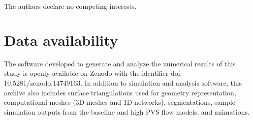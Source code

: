 \documentclass[fleqn,10pt]{wlscirep}
\begin{document}
The authors declare no competing interests.

\section*{Data availability}

The software developed to generate and analyze the numerical results
of this study is openly available on Zenodo with the identifier doi:
10.5281/zenodo.14749163. In addition to simulation and analysis
software, this archive also includes surface triangulations used for
geometry representation, computational meshes (3D meshes and 1D
networks), segmentations, sample simulation outputs from the baseline
and high PVS flow models, and animations. 



\end{document}
